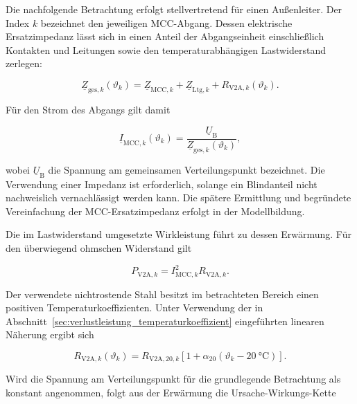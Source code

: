 Die nachfolgende Betrachtung erfolgt stellvertretend für einen Außenleiter.
Der Index \(k\) bezeichnet den jeweiligen MCC-Abgang. Dessen elektrische
Ersatzimpedanz lässt sich in einen Anteil der Abgangseinheit einschließlich
Kontakten und Leitungen sowie den temperaturabhängigen Lastwiderstand
zerlegen:

\begin{equation}
    \underline{Z}_{\mathrm{ges},k}(\vartheta_k)
    =
    \underline{Z}_{\mathrm{MCC},k}
    +
    \underline{Z}_{\mathrm{Ltg},k}
    +
    R_{\mathrm{V2A},k}(\vartheta_k).
    \label{eq:ist_gesamtimpedanz_abgang}
\end{equation}

Für den Strom des Abgangs gilt damit

\begin{equation}
    \underline{I}_{\mathrm{MCC},k}(\vartheta_k)
    =
    \frac{\underline{U}_\mathrm{B}}
    {\underline{Z}_{\mathrm{ges},k}(\vartheta_k)},
    \label{eq:ist_modulstrom_temperatur}
\end{equation}

wobei \(\underline{U}_\mathrm{B}\) die Spannung am gemeinsamen
Verteilungspunkt bezeichnet. Die Verwendung einer Impedanz ist erforderlich,
solange ein Blindanteil nicht nachweislich vernachlässigt werden kann. Die
spätere Ermittlung und begründete Vereinfachung der
MCC-Ersatzimpedanz erfolgt in der Modellbildung.

Die im Lastwiderstand umgesetzte Wirkleistung führt zu dessen Erwärmung. Für
den überwiegend ohmschen Widerstand gilt

\begin{equation}
    P_{\mathrm{V2A},k}
    =
    I_{\mathrm{MCC},k}^{2}R_{\mathrm{V2A},k}.
    \label{eq:ist_verlustleistung_v2a}
\end{equation}

Der verwendete nichtrostende Stahl besitzt im betrachteten Bereich einen
positiven Temperaturkoeffizienten. Unter Verwendung der in
Abschnitt~\ref{sec:verlustleistung_temperaturkoeffizient} eingeführten
linearen Näherung ergibt sich

\begin{equation}
    R_{\mathrm{V2A},k}(\vartheta_k)
    =
    R_{\mathrm{V2A},20,k}
    \left[
        1+
        \alpha_{20}
        \left(\vartheta_k-\SI{20}{\degreeCelsius}\right)
    \right].
    \label{eq:ist_v2a_temperaturabhaengigkeit}
\end{equation}

Wird die Spannung am Verteilungspunkt für die grundlegende Betrachtung als
konstant angenommen, folgt aus der Erwärmung die Ursache-Wirkungs-Kette

